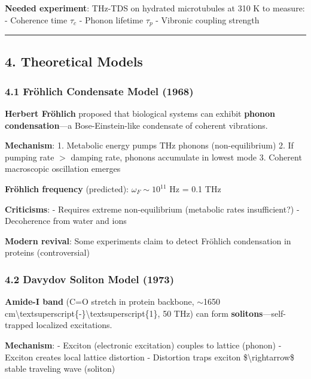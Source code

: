 \textbf{Needed experiment}: THz-TDS on hydrated microtubules at 310 K to
measure: - Coherence time \(\tau_c\) - Phonon lifetime \(\tau_p\) -
Vibronic coupling strength

\begin{center}\rule{0.5\linewidth}{0.5pt}\end{center}

\subsection{4. Theoretical Models}\label{theoretical-models}

\subsubsection{4.1 Fröhlich Condensate Model
(1968)}\label{fruxf6hlich-condensate-model-1968}

\textbf{Herbert Fröhlich} proposed that biological systems can exhibit
\textbf{phonon condensation}---a Bose-Einstein-like condensate of
coherent vibrations.

\textbf{Mechanism}: 1. Metabolic energy pumps THz phonons
(non-equilibrium) 2. If pumping rate $>${} damping rate,
phonons accumulate in lowest mode 3. Coherent macroscopic oscillation
emerges

\textbf{Fröhlich frequency} (predicted): \(\omega_F \sim 10^{11}\) Hz =
0.1 THz

\textbf{Criticisms}: - Requires extreme non-equilibrium (metabolic rates
insufficient?) - Decoherence from water and ions

\textbf{Modern revival}: Some experiments claim to detect Fröhlich
condensation in proteins (controversial)

\subsubsection{4.2 Davydov Soliton Model
(1973)}\label{davydov-soliton-model-1973}

\textbf{Amide-I band} (C=O stretch in protein backbone,
$\sim$1650
cm\textbackslash textsuperscript\{-\}\textbackslash textsuperscript\{1\},
50 THz) can form \textbf{solitons}---self-trapped localized
excitations.

\textbf{Mechanism}: - Exciton (electronic excitation) couples to lattice
(phonon) - Exciton creates local lattice distortion - Distortion traps
exciton \$\textbackslash rightarrow\$ stable traveling wave (soliton)

